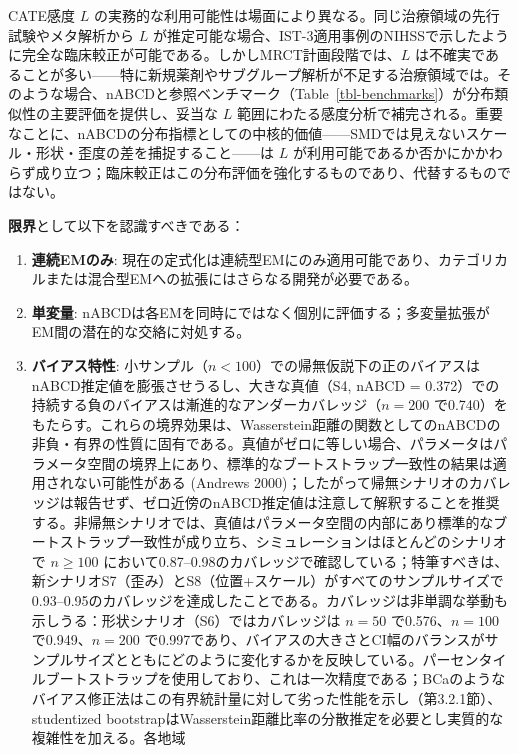 \documentclass[
  a4paper,
  11pt]{ltjsarticle}
\providecommand{\tightlist}{%
  \setlength{\itemsep}{0pt}\setlength{\parskip}{0pt}}\usepackage{longtable,booktabs,array}
\begin{document}
CATE感度 \(L\)
の実務的な利用可能性は場面により異なる。同じ治療領域の先行試験やメタ解析から
\(L\)
が推定可能な場合、IST-3適用事例のNIHSSで示したように完全な臨床較正が可能である。しかしMRCT計画段階では、\(L\)
は不確実であることが多い------特に新規薬剤やサブグループ解析が不足する治療領域では。そのような場合、nABCDと参照ベンチマーク（Table~\ref{tbl-benchmarks}）が分布類似性の主要評価を提供し、妥当な
\(L\)
範囲にわたる感度分析で補完される。重要なことに、nABCDの分布指標としての中核的価値------SMDでは見えないスケール・形状・歪度の差を捕捉すること------は
\(L\)
が利用可能であるか否かにかかわらず成り立つ；臨床較正はこの分布評価を強化するものであり、代替するものではない。

\textbf{限界}として以下を認識すべきである：

\begin{enumerate}
\def\labelenumi{\arabic{enumi}.}
\tightlist
\item
  \textbf{連続EMのみ}:
  現在の定式化は連続型EMにのみ適用可能であり、カテゴリカルまたは混合型EMへの拡張にはさらなる開発が必要である。
\item
  \textbf{単変量}:
  nABCDは各EMを同時にではなく個別に評価する；多変量拡張がEM間の潜在的な交絡に対処する。
\item
  \textbf{バイアス特性}:
  小サンプル（\(n < 100\)）での帰無仮説下の正のバイアスはnABCD推定値を膨張させうるし、大きな真値（S4,
  nABCD =
  0.372）での持続する負のバイアスは漸進的なアンダーカバレッジ（\(n = 200\)
  で0.740）をもたらす。これらの境界効果は、Wasserstein距離の関数としてのnABCDの非負・有界の性質に固有である。真値がゼロに等しい場合、パラメータはパラメータ空間の境界上にあり、標準的なブートストラップ一致性の結果は適用されない可能性がある
  (Andrews
  2000)；したがって帰無シナリオのカバレッジは報告せず、ゼロ近傍のnABCD推定値は注意して解釈することを推奨する。非帰無シナリオでは、真値はパラメータ空間の内部にあり標準的なブートストラップ一致性が成り立ち、シミュレーションはほとんどのシナリオで
  \(n \geq 100\)
  において0.87--0.98のカバレッジで確認している；特筆すべきは、新シナリオS7（歪み）とS8（位置+スケール）がすべてのサンプルサイズで0.93--0.95のカバレッジを達成したことである。カバレッジは非単調な挙動も示しうる：形状シナリオ（S6）ではカバレッジは
  \(n = 50\) で0.576、\(n = 100\) で0.949、\(n = 200\)
  で0.997であり、バイアスの大きさとCI幅のバランスがサンプルサイズとともにどのように変化するかを反映している。パーセンタイルブートストラップを使用しており、これは一次精度である；BCaのようなバイアス修正法はこの有界統計量に対して劣った性能を示し（第3.2.1節）、studentized
  bootstrapはWasserstein距離比率の分散推定を必要とし実質的な複雑性を加える。各地域

\end{enumerate}
\end{document}
